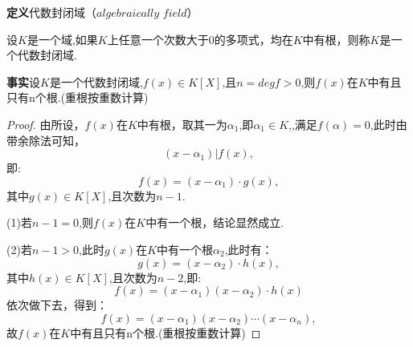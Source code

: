 \documentclass[UTF8]{article}
\begin{document}
\textbf{定义}\quad 代数封闭域（$algebraically$  $field$）

设$K$是一个域,如果$K$上任意一个次数大于0的多项式，均在$K$中有根，则称$K$是一个代数封闭域.

\textbf{事实}\quad 设$K$是一个代数封闭域,$f(x)\in K[X]$,且$n=degf>0$,则$f(x)$在$K$中有且只有n个根.(重根按重数计算)
\begin{proof}
由所设，$f(x)$在$K$中有根，取其一为$\alpha_1$,即$\alpha_1\in K$,,满足$f(\alpha)=0$,此时由带余除法可知，$$(x-\alpha_1)|f(x),$$ 即:$$f(x)=(x-\alpha_1)\cdot g(x),$$其中$g(x)\in K[X]$,且次数为$n-1$.

(1)若$n-1=0$,则$f(x)$在$K$中有一个根，结论显然成立.

(2)若$n-1>0$,此时$g(x)$在$K$中有一个根$\alpha_2$,此时有：$$g(x)=(x-\alpha_2)\cdot h(x),$$其中$h(x)\in K[X]$,且次数为$n-2$,即:$$f(x)=(x-\alpha_1)(x-\alpha_2)\cdot h(x)$$依次做下去，得到：$$f(x)=(x-\alpha_1)(x-\alpha_2) \cdots (x-\alpha_n),$$故$f(x)$在$K$中有且只有n个根.(重根按重数计算)
\end{proof}
\end{document}
